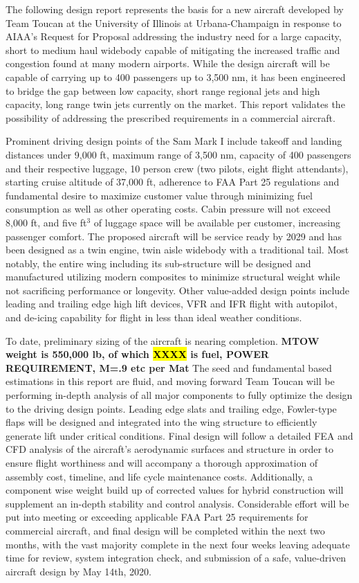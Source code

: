 The following design report represents the basis for a new aircraft developed by Team Toucan at the University of Illinois at Urbana-Champaign in response to AIAA's Request for Proposal\cite{RFP} addressing the industry need for a large capacity, short to medium haul widebody capable of mitigating the increased traffic and congestion found at many modern airports.  While the design aircraft will be capable of carrying up to 400 passengers up to 3,500 nm, it has been engineered to bridge the gap between low capacity, short range regional jets and high capacity, long range twin jets currently on the market.  This report validates the possibility of addressing the prescribed requirements in a commercial aircraft.

Prominent driving design points of the Sam Mark I include takeoff and landing distances under 9,000 ft, maximum range of 3,500 nm, capacity of 400 passengers and their respective luggage, 10 person crew (two pilots, eight flight attendants), starting cruise altitude of 37,000 ft, adherence to FAA Part 25 regulations and fundamental desire to maximize customer value through minimizing fuel consumption as well as other operating costs.  Cabin pressure will not exceed 8,000 ft, and five ft$^3$ of luggage space will be available per customer, increasing passenger comfort.  The proposed aircraft will be service ready by 2029 and has been designed as a twin engine, twin aisle widebody with a traditional tail.  Most notably, the entire wing including its sub-structure will be designed and manufactured utilizing modern composites to minimize structural weight while not sacrificing performance or longevity.  Other value-added design points include leading and trailing edge high lift devices, VFR and IFR flight with autopilot, and de-icing capability for flight in less than ideal weather conditions.

To date, preliminary sizing of the aircraft is nearing completion.  \textbf{MTOW weight is 550,000 lb, of which \hl{XXXX} is fuel, POWER REQUIREMENT, M=.9 etc per Mat} The seed and fundamental based estimations in this report are fluid, and moving forward Team Toucan will be performing in-depth analysis of all major components to fully optimize the design to the driving design points.  Leading edge slats and trailing edge, Fowler-type flaps will be designed and integrated into the wing structure to efficiently generate lift under critical conditions.  Final design will follow a detailed FEA and CFD analysis of the aircraft's aerodynamic surfaces and structure in order to ensure flight worthiness and will accompany a thorough approximation of assembly cost, timeline, and life cycle maintenance costs.  Additionally, a component wise weight build up of corrected values for hybrid construction will supplement an in-depth stability and control analysis.  Considerable effort will be put into meeting or exceeding applicable FAA Part 25 requirements for commercial aircraft, and final design will be completed within the next two months, with the vast majority complete in the next four weeks leaving adequate time for review, system integration check, and submission of a safe, value-driven aircraft design by May 14th, 2020.

